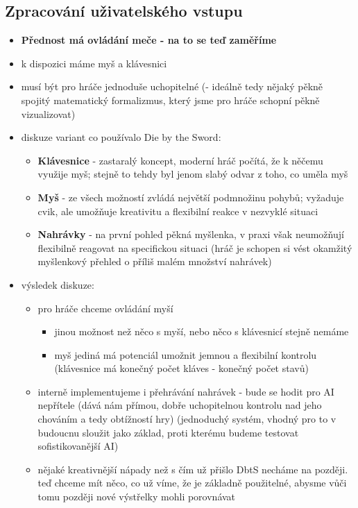 \subsection{Zpracování uživatelského vstupu}
\begin{itemize}
    \item \textbf{Přednost má ovládání meče - na to se teď zaměříme}
    \item k dispozici máme myš a klávesnici
    \item musí být pro hráče jednoduše uchopitelné (- ideálně tedy nějaký pěkně spojitý matematický formalizmus, který jsme pro hráče schopní pěkně vizualizovat)
    \item diskuze variant co používalo Die by the Sword:
        \begin{itemize}
            \item \textbf{Klávesnice} - zastaralý koncept, moderní hráč počítá, že k něčemu využije myš; stejně to tehdy byl jenom slabý odvar z toho, co uměla myš
            \item \textbf{Myš} - ze všech možností zvládá největší podmnožinu pohybů; vyžaduje cvik, ale umožňuje kreativitu a flexibilní reakce v nezvyklé situaci
            \item \textbf{Nahrávky} - na první pohled pěkná myšlenka, v praxi však neumožňují flexibilně reagovat na specifickou situaci (hráč je schopen si vést okamžitý myšlenkový přehled o příliš malém množství nahrávek)
        \end{itemize}
    \item výsledek diskuze:
        \begin{itemize}
            \item pro hráče chceme ovládání myší
            \begin{itemize}
                \item jinou možnost než něco s myší, nebo něco s klávesnicí stejně nemáme
                \item myš jediná má potenciál umožnit jemnou a flexibilní kontrolu (klávesnice má konečný počet kláves - konečný počet stavů)
            \end{itemize}
            \item interně implementujeme i přehrávání nahrávek - bude se hodit pro AI nepřítele (dává nám přímou, dobře uchopitelnou kontrolu nad jeho chováním a tedy obtížností hry) (jednoduchý systém, vhodný pro to v budoucnu sloužit jako základ, proti kterému budeme testovat sofistikovanější AI)
            \item nějaké kreativnější nápady než s čím už přišlo DbtS necháme na později. teď chceme mít něco, co už víme, že je základně použitelné, abysme vůči tomu později nové výstřelky mohli porovnávat

\end{itemize}
\end{itemize}
